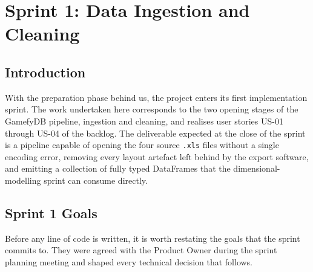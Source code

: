 
\providecommand{\todoFigure}[2][0.7\textwidth]{%
  \fcolorbox{red!60!black}{red!5}{%
    \parbox{#1}{\centering\vspace{0.6cm}%
      \textcolor{red!60!black}{\textbf{[TODO --- insert figure]}}\\[4pt]
      \textit{#2}\vspace{0.6cm}}}%
}

\chapter{Sprint 1: Data Ingestion and Cleaning}

\section{Introduction}

With the preparation phase behind us, the project enters its first
implementation sprint. The work undertaken here corresponds to the two
opening stages of the GamefyDB pipeline, ingestion and cleaning, and
realises user stories US-01 through US-04 of the backlog. The deliverable
expected at the close of the sprint is a pipeline capable of opening the
four source \texttt{.xls} files without a single encoding error, removing
every layout artefact left behind by the export software, and emitting a
collection of fully typed DataFrames that the dimensional-modelling sprint
can consume directly.

\section{Sprint 1 Goals}

Before any line of code is written, it is worth restating the goals that
the sprint commits to. They were agreed with the Product Owner during the
sprint planning meeting and shaped every technical decision that follows.

